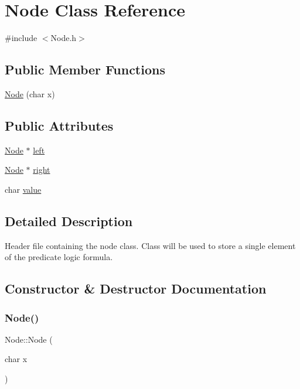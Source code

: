 \hypertarget{class_node}{}\section{Node Class Reference}
\label{class_node}


{\ttfamily \#include $<$Node.\+h$>$}

\subsection*{Public Member Functions}
\begin{DoxyCompactItemize}
\item 
\mbox{\hyperlink{class_node_a5e91c41bab1775f61353373403a4ca05}{Node}} (char x)
\end{DoxyCompactItemize}
\subsection*{Public Attributes}
\begin{DoxyCompactItemize}
\item 
\mbox{\hyperlink{class_node}{Node}} $\ast$ \mbox{\hyperlink{class_node_ab8c667ac8fdb120ed4c031682a9cdaee}{left}}
\item 
\mbox{\hyperlink{class_node}{Node}} $\ast$ \mbox{\hyperlink{class_node_afe5916d969cd32f7de1e4ba15580c989}{right}}
\item 
char \mbox{\hyperlink{class_node_a8935385009892a43bb92f31f17884179}{value}}
\end{DoxyCompactItemize}


\subsection{Detailed Description}
Header file containing the node class. Class will be used to store a single element of the predicate logic formula. 

\subsection{Constructor \& Destructor Documentation}
\mbox{\label{class_node_a5e91c41bab1775f61353373403a4ca05}} 
\subsubsection{\texorpdfstring{Node()}{Node()}}
{\footnotesize\ttfamily Node\+::\+Node (\begin{DoxyParamCaption}\item[{char}]{x }\end{DoxyParamCaption})\hspace{0.3cm}{\ttfamily [inline]}}


